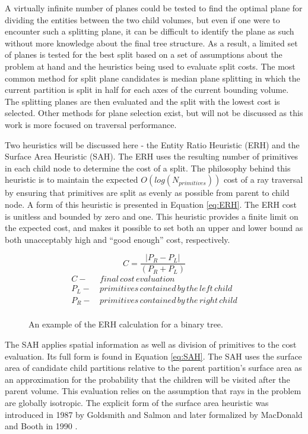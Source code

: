 A virtually infinite number of planes could be tested to find the optimal plane for
dividing the entities between the two child volumes, but even if one were to
encounter such a splitting plane, it can be difficult to identify the plane as
such without more knowledge about the final tree structure. As a result, a
limited set of planes is tested for the best split based on a set of assumptions
about the problem at hand and the heuristics being used to evaluate split
costs. The most common method for split plane candidates is median plane
splitting in which the current partition is split in half for each axes of the
current bounding volume. The splitting planes are then evaluated and the split
with the lowest cost is selected. Other methods for plane selection exist, but
will not be discussed as this work is more focused on traversal performance.

Two heuristics will be discussed here - the Entity Ratio Heuristic (ERH) and the
Surface Area Heuristic (SAH). The ERH uses the resulting number of primitives in
each child node to determine the cost of a split. The philosophy behind this
heuristic is to maintain the expected $O(log(N_{primitives}))$ cost of a ray
traversal by ensuring that primitives are split as evenly as possible from
parent to child node. A form of this heuristic is presented in Equation
\eqref{eq:ERH}. The ERH cost is unitless and bounded by zero and one. This
heuristic provides a finite limit on the expected cost, and makes it possible to
set both an upper and lower bound as both unacceptably high and ``good enough''
cost, respectively.

\begin{figure}[H]
\begin{equation}
\label{eq:ERH}
 C = \frac{|P_{R}-P_{L}|}{(P_{R} + P_{L})} 
\end{equation}
  \begin{align*}
    C - & \,final \, cost \, evaluation \\
    P_{L} - & \, primitives\, contained\, by\, the\, left\, child  \\
    P_{R} - & \, primitives\, contained\, by\, the\, right\, child \\
  \end{align*}
  \caption[Formulation for the entity ratio heuristic.]{An example of the ERH calculation for a binary tree.}
  \label{fig:ERH}
\end{figure}

The SAH applies spatial information as well as division of primitives to the
cost evaluation. Its full form is found in Equation \eqref{eq:SAH}. The SAH uses
the surface area of candidate child partitions relative to the parent
partition's surface area as an approximation for the probability that the children
will be visited after the parent volume. This evaluation relies on the
assumption that rays in the problem are globally isotropic. The explicit form of
the surface area heuristic was introduced in 1987 by Goldsmith and Salmon
\cite{Goldsmith_1987} and later formalized by MacDonald and Booth in 1990
\cite{MacDonald_1990}.

